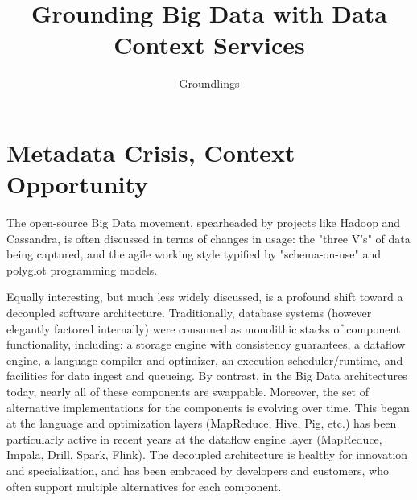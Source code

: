 \documentclass{sig-alternate}
\begin{document}

\title{Grounding Big Data with Data Context Services}
\author{
Groundlings
}

\maketitle

\section{Metadata Crisis, Context Opportunity}
The open-source Big Data movement, spearheaded by projects like Hadoop and Cassandra, is often discussed in terms of changes in usage: the "three V's" of data being captured, and the agile working style typified by "schema-on-use" and polyglot programming models.

Equally interesting, but much less widely discussed, is a profound shift toward a decoupled software architecture. Traditionally, database systems (however elegantly factored internally) were consumed as monolithic stacks of component functionality, including: a storage engine with consistency guarantees, a dataflow engine, a language compiler and optimizer, an execution scheduler/runtime, and facilities for data ingest and queueing.  By contrast, in the Big Data architectures today, nearly all of these components are swappable. Moreover, the set of alternative implementations for the components is evolving over time. This began at the language and optimization layers (MapReduce, Hive, Pig, etc.)  has been particularly active in recent years at the dataflow engine layer (MapReduce, Impala, Drill, Spark, Flink). The decoupled architecture is healthy for innovation and specialization, and has been embraced by developers and customers, who often support multiple alternatives for each component.
\end{document}
